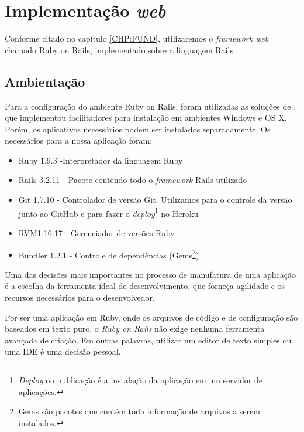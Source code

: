 
 
  \chapter{Implementação \emph{web}} \label{CHP:RAILS}%
	Conforme citado no capítulo \ref{CHP:FUND}, utilizaremos o \emph{framework} \emph{web} chamado Ruby on Rails, implementado sobre a linguagem Rails.
    \section{Ambientação}
     
    Para a configuração do ambiente Ruby on Rails, foram utilizadas as soluções de \cite{railsinstaller}, que implementou facilitadores para instalação em ambientes Windows e OS X. Porém, os aplicativos necessários podem ser instalados separadamente. Os necessários para a nossa aplicação foram:
\begin{itemize}
\item Ruby 1.9.3 -Interpretador da linguagem Ruby
\item Rails 3.2.11 - Pacote contendo todo o \emph{framework} Rails utilizado
\item Git 1.7.10 - Controlador de versão Git. Utilizamos para o controle da versão junto ao GitHub e para fazer o \emph{deploy}\footnote{\emph{Deploy} ou publicação é a instalação da aplicação em um servidor de aplicações.} no Heroku
\item RVM1.16.17 - Gerenciador de versões Ruby
\item Bundler 1.2.1 - Controle de dependências (Gems\footnote{Gems são pacotes que contém toda informação de arquivos a serem instalados.})
\end{itemize}     
    
	Uma das decisões mais importantes no processo de manufatura de uma aplicação é a escolha da ferramenta ideal de desenvolvimento, que forneça agilidade e os recursos necessários para o desenvolvedor.
	
    Por ser uma aplicação em Ruby, onde os arquivos de código e de configuração são baseados em texto puro, o \emph{Ruby on Rails} não exige nenhuma ferramenta avançada de criação. Em outras palavras, utilizar um editor de texto simples ou uma \ac{IDE} é uma decisão pessoal.
	
